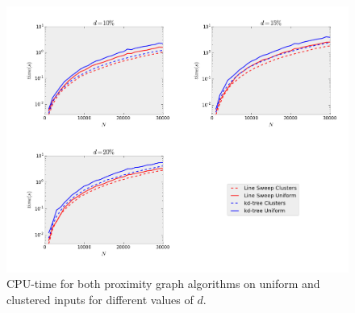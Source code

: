 \begin{figure}[!h] 
	\centering 
	\vspace{-25pt}
    \includegraphics[width=\linewidth]{Pictures/ls_kd_t}
    \caption[CPU-time for Line Sweep and $k$-d Tree range search.]{CPU-time for both proximity graph algorithms on uniform and clustered inputs for different values of $d$.}
    \label{fig:ls_kd_t} 
\end{figure}

